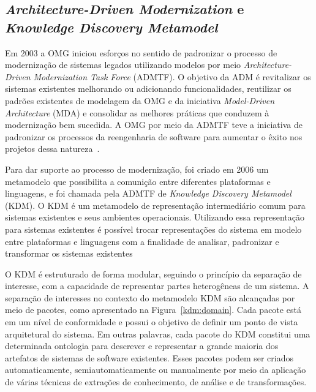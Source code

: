 \documentclass[12pt]{article}
\begin{document}
\subsection{\textit{Architecture-Driven Modernization} e \textit{Knowledge Discovery Metamodel}}

Em 2003 a OMG iniciou esforços no sentido de padronizar o processo de modernização de sistemas legados utilizando modelos por meio \textit{Architecture-Driven Modernization Task Force} (ADMTF). O objetivo da ADM é revitalizar os sistemas existentes melhorando ou adicionando funcionalidades, reutilizar os padrões existentes de modelagem da OMG e da iniciativa \textit{Model-Driven Architecture} (MDA) e consolidar as melhores práticas que conduzem à modernização bem sucedida. A OMG por meio da ADMTF teve a iniciativa de padronizar os processos da reengenharia de software para aumentar o êxito nos projetos dessa natureza~\cite{PerezCastillo:2011jo}. 

Para dar suporte ao processo de modernização, foi criado em 2006 um metamodelo que possibilita a comunição entre diferentes plataformas e linguagens, e foi chamada pela ADMTF de \textit{Knowledge Discovery Metamodel} (KDM). O KDM é um metamodelo de representação intermediário comum para sistemas existentes e seus ambientes operacionais. Utilizando essa representação para sistemas existentes é possível trocar representações do sistema em modelo entre plataformas e linguagens com a finalidade de analisar, padronizar e transformar os sistemas existentes~\cite{PerezCastillo:2011jo, ADMCHAPTERR}


O KDM é estruturado de forma modular, seguindo o princípio da separação de interesse, com a capacidade de representar partes heterogêneas de um sistema. A separação de interesses no contexto do metamodelo KDM são alcançadas por meio de pacotes, como apresentado na Figura~\ref{kdm:domain}. Cada pacote está em um nível de conformidade e possui o objetivo de definir um ponto de vista arquitetural do sistema. Em outras palavras, cada pacote do KDM constitui uma determinada ontologia para descrever e representar a grande maioria dos artefatos de sistemas de software existentes. Esses pacotes podem ser criados automaticamente, semiautomaticamente ou manualmente por meio da aplicação de várias técnicas de extrações de conhecimento, de análise e de transformações. 
\end{document}
